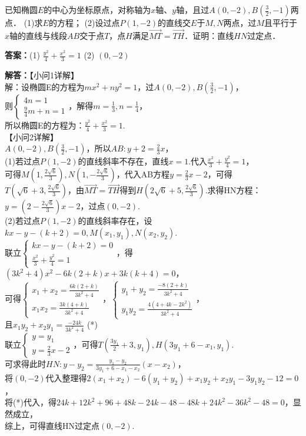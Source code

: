 \documentclass[UTF8,a4paper,11pt]{ctexart}
\begin{document}
已知椭圆$E$的中心为坐标原点，对称轴为$x$轴、$y$轴，且过$A(0,-2), B\left(\frac{3}{2},-1\right)$两点．
(1)求$E$的方程；
(2)设过点$P(1,-2)$的直线交$E$于$M,N$两点，过$M$且平行于$x$轴的直线与线段$AB$交于点$T$，点$H$满足$\overrightarrow{MT}=\overrightarrow{TH}$．证明：直线$HN$过定点．

\textbf{答案：}(1) $\frac{y^2}{4}+\frac{x^2}{3}=1$
(2) $(0,-2)$\par

\textbf{解答：}【小问1详解】\\解：设椭圆E的方程为$mx^2+ny^2=1$，过$A(0,-2), B\left(\frac{3}{2},-1\right)$，\\则$\begin{cases} 4n=1 \\ \frac{9}{4}m+n=1 \end{cases}$，解得$m=\frac{1}{3}, n=\frac{1}{4}$，\\所以椭圆E的方程为：$\frac{y^2}{4}+\frac{x^2}{3}=1$.\\【小问2详解】\\$A(0,-2), B(\frac{3}{2},-1)$，所以$AB: y+2 = \frac{2}{3}x$，\\(1)若过点$P(1,-2)$的直线斜率不存在，直线$x=1$.代入$\frac{x^2}{3}+\frac{y^2}{4}=1$，\\可得$M\left(1,\frac{2\sqrt{6}}{3}\right), N\left(1,-\frac{2\sqrt{6}}{3}\right)$，代入AB方程$y=\frac{2}{3}x-2$，可得\\$T\left(\sqrt{6}+3,\frac{2\sqrt{6}}{3}\right)$，由$\overrightarrow{MT}=\overrightarrow{TH}$得到$H\left(2\sqrt{6}+5,\frac{2\sqrt{6}}{3}\right)$.求得HN方程：$y=\left(2-\frac{2\sqrt{6}}{3}\right)x-2$，过点$(0,-2)$.\\(2)若过点$P(1,-2)$的直线斜率存在，设$kx-y-(k+2)=0, M(x_1,y_1), N(x_2,y_2)$.\\联立$\begin{cases} kx-y-(k+2)=0 \\ \frac{x^2}{3}+\frac{y^2}{4}=1 \end{cases}$，得$(3k^2+4)x^2 - 6k(2+k)x + 3k(k+4)=0$，\\可得$\begin{cases} x_1+x_2 = \frac{6k(2+k)}{3k^2+4} \\ x_1x_2 = \frac{3k(4+k)}{3k^2+4} \end{cases}$，$\begin{cases} y_1+y_2 = \frac{-8(2+k)}{3k^2+4} \\ y_1y_2 = \frac{4(4+4k-2k^2)}{3k^2+4} \end{cases}$，\\且$x_1y_2+x_2y_1 = \frac{-24k}{3k^2+4}$ (*)\\联立$\begin{cases} y=y_1 \\ y=\frac{2}{3}x-2 \end{cases}$，可得$T\left(\frac{3y_1}{2}+3, y_1\right), H(3y_1+6-x_1, y_1)$.\\可求得此时$HN: y-y_2 = \frac{y_1-y_2}{3y_1+6-x_1-x_2}(x-x_2)$，\\将$(0,-2)$代入整理得$2(x_1+x_2)-6(y_1+y_2)+x_1y_2+x_2y_1-3y_1y_2-12=0$，\\将(*)代入，得$24k+12k^2+96+48k-24k-48-48k+24k^2-36k^2-48=0$，显然成立，\\综上，可得直线HN过定点$(0,-2)$.
\end{document}
